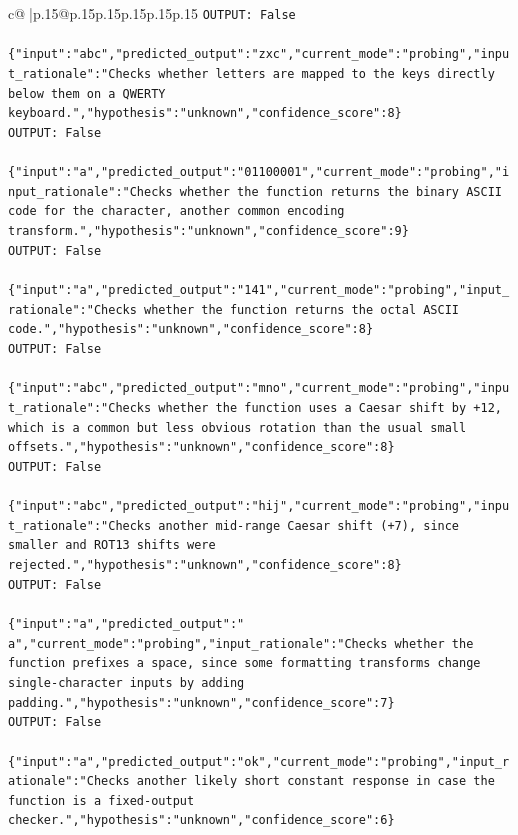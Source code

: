 \documentclass{article}
\begin{document}
{\begin{supertabular}{c@{$\;$}|p{.15\linewidth}@{}p{.15\linewidth}p{.15\linewidth}p{.15\linewidth}p{.15\linewidth}p{.15\linewidth}}
{{{\texttt{OUTPUT: False} \\
\\ 
\texttt{\{"input":"abc","predicted\_output":"zxc","current\_mode":"probing","input\_rationale":"Checks whether letters are mapped to the keys directly below them on a QWERTY keyboard.","hypothesis":"unknown","confidence\_score":8\}} \\
\texttt{OUTPUT: False} \\
\\ 
\texttt{\{"input":"a","predicted\_output":"01100001","current\_mode":"probing","input\_rationale":"Checks whether the function returns the binary ASCII code for the character, another common encoding transform.","hypothesis":"unknown","confidence\_score":9\}} \\
\texttt{OUTPUT: False} \\
\\ 
\texttt{\{"input":"a","predicted\_output":"141","current\_mode":"probing","input\_rationale":"Checks whether the function returns the octal ASCII code.","hypothesis":"unknown","confidence\_score":8\}} \\
\texttt{OUTPUT: False} \\
\\ 
\texttt{\{"input":"abc","predicted\_output":"mno","current\_mode":"probing","input\_rationale":"Checks whether the function uses a Caesar shift by +12, which is a common but less obvious rotation than the usual small offsets.","hypothesis":"unknown","confidence\_score":8\}} \\
\texttt{OUTPUT: False} \\
\\ 
\texttt{\{"input":"abc","predicted\_output":"hij","current\_mode":"probing","input\_rationale":"Checks another mid{-}range Caesar shift (+7), since smaller and ROT13 shifts were rejected.","hypothesis":"unknown","confidence\_score":8\}} \\
\texttt{OUTPUT: False} \\
\\ 
\texttt{\{"input":"a","predicted\_output":" a","current\_mode":"probing","input\_rationale":"Checks whether the function prefixes a space, since some formatting transforms change single{-}character inputs by adding padding.","hypothesis":"unknown","confidence\_score":7\}} \\
\texttt{OUTPUT: False} \\
\\ 
\texttt{\{"input":"a","predicted\_output":"ok","current\_mode":"probing","input\_rationale":"Checks another likely short constant response in case the function is a fixed{-}output checker.","hypothesis":"unknown","confidence\_score":6\}} \\
}}}
\end{supertabular}}
\end{document}
